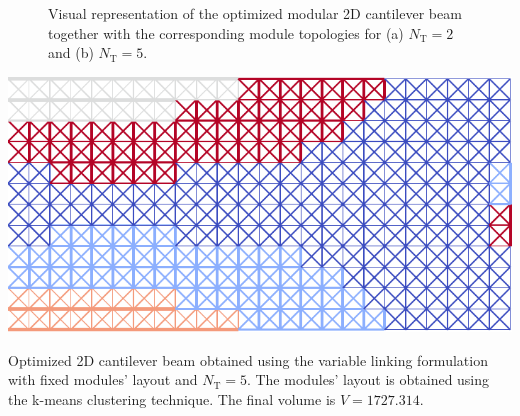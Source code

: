 \begin{figure}
    \hfill
    \caption{Visual representation of the optimized modular 2D cantilever beam together with the corresponding module topologies for (a) $N_\text{T}=2$  and (b) $N_\text{T}=5$.}
    \label{fig:06_diferent_modules_cant_topology}
\end{figure}

\begin{marginfigure}
    \centering
    \includegraphics[width=\linewidth]{figures/06_DMO/00_optimized_modules/VL/nt=5VL.pdf}
    \caption{Optimized 2D cantilever beam obtained using the variable linking formulation with fixed modules' layout and $N_\text{T}=5$. The modules' layout is obtained using the k-means clustering technique. The final volume is $V = 1727.314$.}
    \label{fig:06_cant_variable_link}
\end{marginfigure}

